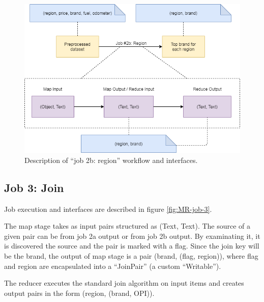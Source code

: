 \begin{figure}[H]
	\centering
	\includegraphics[scale=0.7]{images/2-mapreduce/MR-job-2b.png}
	\caption{Description of ``job 2b: region'' workflow and interfaces.}
	\label{fig:MR-job-2b}
\end{figure}  

\subsection{Job 3: Join}

Job execution and interfaces are described in figure \ref{fig:MR-job-3}.

The map stage takes as input pairs structured as (Text, Text). The source of a given pair can be from job 2a output or from job 2b output. By examinating it, it is discovered the source and the pair is marked with a flag.
Since the join key will be the brand, the output of map stage is a pair (brand, (flag, region)), where flag and region are encapsulated into a ``JoinPair'' (a custom ``Writable'').

The reducer executes the standard join algorithm on input items and creates output pairs in the form (region, (brand, OPI)). 

